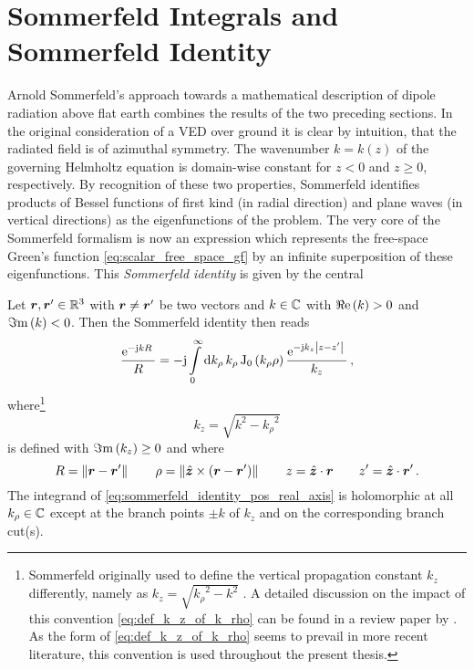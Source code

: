 









\section{Sommerfeld Integrals and Sommerfeld Identity}
\label{sec:sommerfeld_integrals_and_identity}

Arnold Sommerfeld's approach towards a mathematical description of dipole
radiation above flat earth combines the results of the two preceding
sections.
In the original consideration of a \ac{VED} over ground \cite{Sommerfeld1909}
it is clear by intuition, that the radiated field is of azimuthal symmetry.
The wavenumber $k = k\left(z\right)$ of the governing Helmholtz equation is
domain-wise constant for $z < 0$ and $z \geq 0$, respectively.
By recognition of these two properties, Sommerfeld identifies products of
Bessel functions of first kind (in radial direction) and plane waves
(in vertical directions) as the eigenfunctions of the problem.
The very core of the Sommerfeld formalism is now an expression which represents
the free-space Green's function \eqref{eq:scalar_free_space_gf} by an infinite
superposition of these eigenfunctions.
This \emph{Sommerfeld identity} is given by the central
\cite[eq.~(10)]{Sommerfeld1909}\cite[66]{Chew1999}
\begin{theorem}\label{thm:sommerfeld_identity}
	Let $\robs, \rsrc \in \R^3$ with $\robs \neq \rsrc$ be two vectors and
	$k \in \mathbb{C}$ with $\Re\mathrm{e}\left(k\right) > 0$ and $\Im\mathrm{m}\left(k\right) < 0$.
	Then the Sommerfeld identity then reads
	\begin{equation}\label{eq:sommerfeld_identity_pos_real_axis}
		\frac{\mathrm{e}^{-\mathrm{j} k R}\,}{R} = 
		-\mathrm{j}
		\int\limits_{0}^{\infty} \mathrm{d} k_\rho \, k_\rho
		\operatorname{J}_{0} \left(k_\rho \rho\right)
		\frac{\mathrm{e}^{-\mathrm{j} k_z \left\vert z - z^\prime\right\vert}\,}{k_z}
		\, ,
	\end{equation}
	where\footnote{
		Sommerfeld originally used to define the vertical propagation constant
		$k_z$ differently, namely as $k_z = \sqrt{{k_\rho}^2 - k^2}$
		\cite{Sommerfeld1909,Sommerfeld1964}.
		A detailed discussion on the impact of this convention \vs
		\eqref{eq:def_k_z_of_k_rho} can be found in a review paper by
		\textcite{Mosig2021}.
		As the form of \eqref{eq:def_k_z_of_k_rho} seems to prevail in
		more recent literature, this convention is used throughout the present
		thesis.
		}
	\begin{equation}\label{eq:def_k_z_of_k_rho}
		k_z = \sqrt{k^2 - {k_\rho}^2}
	\end{equation}
	is defined with $\Im\mathrm{m}\left(k_z\right) \geq 0$ and where
	\begin{equation}
		\rdiffNormSymbol = \rdiffNorm \qquad
		\rho = \norm{\uv{z} \times \left(\rdiff\right)} \qquad
		z = \uv{z} \cdot \robs \qquad
		z^\prime = \uv{z} \cdot \rsrc
		\, .
	\end{equation}
	The integrand of \eqref{eq:sommerfeld_identity_pos_real_axis} is holomorphic
	at all $k_\rho \in \mathbb{C}$ except at the branch points $\pm k$ of $k_z$ and
	on the corresponding branch cut(s).
\end{theorem}

